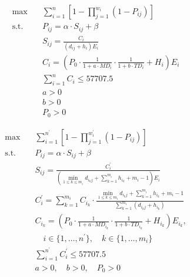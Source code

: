 \documentclass[UTF8,a4paper]{ctexart}
\begin{document}
    \[
        \begin{aligned}
            \max \quad & \sum_{i=1}^{n} \left[ 1-\prod_{j=1}^{w_{i}} (1-P_{ij}) \right] \\
            \text{s.t.} \quad & P_{ij} = \alpha \cdot S_{ij} + \beta \\
            & S_{ij} = \frac{C_i}{(d_{ij} + h_i)E_{i}}\\
            & C_i = \left( P_0 \cdot \frac{1}{1+a \cdot MD_i} \cdot \frac{1}{1+b \cdot TD_i} + H_i \right)E_i \\
            & \sum_{i=1}^{n} C_i \leqslant 57707.5 \\
            & a > 0 \\
            & b > 0 \\
            & P_0 > 0
        \end{aligned}
    \]

    \[
        \begin{aligned}
            \max \quad & \sum_{i=1}^{n^{\prime}} \left[ 1 - \prod_{j=1}^{w_{i}^{\prime}} (1 - P_{ij}) \right] \\
            \text{s.t.} \quad & P_{ij} = \alpha \cdot S_{ij} + \beta \\
            & S_{ij} = \frac{C_i^{\prime}}{\left( \min_{1 \leqslant  k \leqslant  m_i} d_{i_k j} + \sum_{k=1}^{m_i} h_{i_k} + m_i - 1 \right) E_i} \\
            & C_i^{\prime} = \sum_{k=1}^{m_i} C_{i_k} \cdot \frac{ \min_{1 \leqslant  k \leqslant  m_i} d_{i_k j} + \sum_{k=1}^{m_i} h_{i_k} + m_i - 1 }{ \sum_{k=1}^{m_i} (d_{i_k j} + h_{i_k}) } \\
            & C_{i_k} = \left( P_0 \cdot \frac{1}{1 + a \cdot MD_{i_k}} \cdot \frac{1}{1 + b \cdot TD_{i_k} }+ H_{i_k} \right) E_{i_k}, \\
            & \quad i \in \{1, \dots, n^{\prime} \},\quad k \in \{1, \dots, m_i \} \\
            & \sum_{i=1}^{n^{\prime}} C_i^{\prime} \leqslant  57707.5 \\
            & a > 0,\quad b > 0,\quad P_0 > 0
        \end{aligned}
    \]
\end{document}
